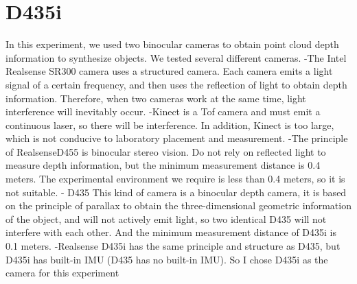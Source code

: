 \section{D435i}
In this experiment, we used two binocular cameras to obtain point cloud depth information to synthesize objects. We tested several different cameras.
-The Intel Realsense SR300 camera uses a structured camera. Each camera emits a light signal of a certain frequency, and then uses the reflection of light to obtain depth information. Therefore, when two cameras work at the same time, light interference will inevitably occur.
-Kinect is a Tof camera and must emit a continuous laser, so there will be interference. In addition, Kinect is too large, which is not conducive to laboratory placement and measurement.
-The principle of RealsenseD455 is binocular stereo vision. Do not rely on reflected light to measure depth information, but the minimum measurement distance is 0.4 meters. The experimental environment we require is less than 0.4 meters, so it is not suitable.
- D435 This kind of camera is a binocular depth camera, it is based on the principle of parallax to obtain the three-dimensional geometric information of the object, and will not actively emit light, so two identical D435 will not interfere with each other. And the minimum measurement distance of D435i is 0.1 meters.
-Realsense D435i has the same principle and structure as D435, but D435i has built-in IMU (D435 has no built-in IMU).
So I chose D435i as the camera for this experiment

